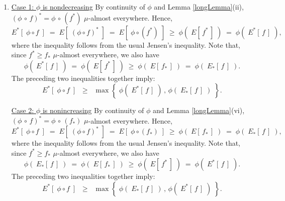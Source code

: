 \begin{enumerate}
\item
	\underline{Case 1: $\phi$ is nondecreasing}
	\vskip 0.0cm
	\noindent
	By continuity of $\phi$ and Lemma \ref{longLemma}(ii),
	$(\phi\,\circ\,f)^{*} = \phi\,\circ\,(f^{*})$ $\mu$-almost everywhere.
	Hence,
	\begin{equation*}
	E^{*}\!\left[\;\phi \circ f\;\right]
		\;=\; E\!\left[\;(\phi \circ f)^{*}\;\right]
		\;=\; E\!\left[\;\phi \circ (f^{*})\;\right]
		\;\geq\; \phi(\;E[\,f^{*}\,]\;)
		\;=\; \phi(\;E^{*}[\,f\,]\;),
	\end{equation*}
	where the inequality follows from the usual Jensen's inequality.
	Note that, since $f^{*} \geq f_{*}$ $\mu$-almost everywhere, we also have
	\begin{equation*}
	\phi(\;E^{*}[\,f\,]\;)
		\;=\; \phi(\;E[\,f^{*}\,]\;)
		\;\geq\; \phi(\;E[\,f_{*}\,]\;)
		\;=\; \phi(\;E_{*}[\,f\,]\;).
	\end{equation*}
	The preceding two inequalities together imply:
	\begin{equation*}
	E^{*}\!\left[\;\phi \circ f\;\right]
		\;\;\geq\;\; \max\!\left\{\;\phi(\;E^{*}[\,f\,]\;) \,,\, \phi(\;E_{*}[\,f\,]\;)\;\right\}.
	\end{equation*}

	\vskip 0.0cm
	\underline{Case 2: $\phi$ is nonincreasing}
	\vskip 0.0cm
	\noindent
	By continuity of $\phi$ and Lemma \ref{longLemma}(vi),
	$(\phi\,\circ\,f)^{*} = \phi\,\circ\,(f_{*})$ $\mu$-almost everywhere.
	Hence,
	\begin{equation*}
	E^{*}\!\left[\;\phi \circ f\;\right]
		\;=\; E\!\left[\;(\phi \circ f)^{*}\;\right]
		\;=\; E\!\left[\;\phi \circ (f_{*})\;\right]
		\;\geq\; \phi(\;E[\,f_{*}\,]\;)
		\;=\; \phi(\;E_{*}[\,f\,]\;),
	\end{equation*}
	where the inequality follows from the usual Jensen's inequality.
	Note that, since $f^{*} \geq f_{*}$ $\mu$-almost everywhere, we also have
	\begin{equation*}
	\phi(\;E_{*}[\,f\,]\;)
		\;=\; \phi(\;E[\,f_{*}\,]\;)
		\;\geq\; \phi(\;E[\,f^{*}\,]\;)
		\;=\; \phi(\;E^{*}[\,f\,]\;).
	\end{equation*}
	The preceding two inequalities together imply:
	\begin{equation*}
	E^{*}\!\left[\;\phi \circ f\;\right]
		\;\;\geq\;\; \max\!\left\{\;\phi(\;E_{*}[\,f\,]\;) \,,\, \phi(\;E^{*}[\,f\,]\;)\;\right\}.
	\end{equation*}


\end{enumerate}

